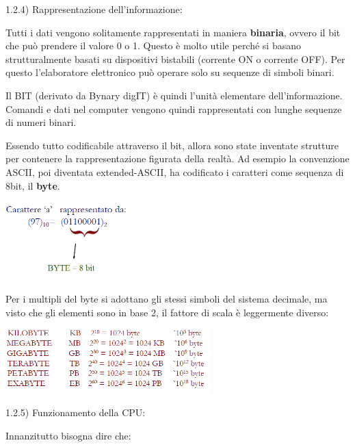 \documentclass[
  paper=a4,
  oneside  ,captions=tableheading
]{scrbook}
\begin{document}
1.2.4) Rappresentazione dell'informazione:

Tutti i dati vengono solitamente rappresentati in maniera
\textbf{binaria}, ovvero il bit che può prendere il valore 0 o 1. Questo
è molto utile perché si basano strutturalmente basati su dispositivi
bistabili (corrente ON o corrente OFF). Per questo l'elaboratore
elettronico può operare solo su sequenze di simboli binari.

Il BIT (derivato da Bynary digIT) è quindi l'unità elementare
dell'informazione. Comandi e dati nel computer vengono quindi
rappresentati con lunghe sequenze di numeri binari.

Essendo tutto codificabile attraverso il bit, allora sono state
inventate strutture per contenere la rappresentazione figurata della
realtà. Ad esempio la convenzione ASCII, poi diventata extended-ASCII,
ha codificato i caratteri come sequenza di 8bit, il \textbf{byte}.

\includegraphics[height=3cm]{./image/image-20201111184647324.png}

Per i multipli del byte si adottano gli stessi simboli del sistema
decimale, ma visto che gli elementi sono in base 2, il fattore di scala
è leggermente diverso:

\includegraphics[height=2.5cm]{./image/image-20201111184937248.png}

1.2.5) Funzionamento della CPU:

Innanzitutto bisogna dire che:
\end{document}
